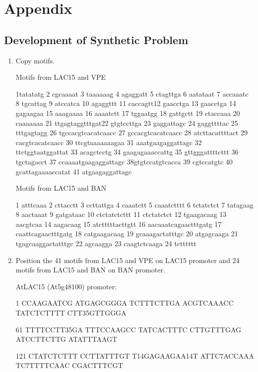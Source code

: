 \chapter{Appendix}\label{chapter:appendix}

\section{Development of Synthetic Problem}

\begin{enumerate}

\item Copy motifs. 
 
Motifs from LAC15 and VPE 

{\tiny
1tatatatg 2 cgcaaaat 3 taaaaaag 4 agaggatt 5 ctagttga 6 aatataat 7 accaaatc 8 tgcattag 9 atccatca 10 agaggttt 11 caccagtt12 gaacctga 13 gaacctga 14 gagaagaa 15 aaagaaaa 16 aaaatctt 17 tggaatgg 18 gattgctt 19 ctaccaaa 20 caaaaaaa 21 ttgagtaggtttgat22 gtgtccttga 23 gaggattagc 24 gaggttttac 25 tttgagtagg 26 tgccacgtcacatcaacc 27 gccacgtcacatcaacc 28 atcttacattttact 29 cacgtcacatcaacc 30 ttcgtaaaaaaagaa 31 aaatgaagaggattagc 32 ttctggtaatggattat 33 acagctcctg 34 gaagagaaaccattg 35 gttgggattttcttt 36 tgctagacct 37 ccaaaatgaagaggattagc 38gtgtccatgtcacca 39 cgtccatgtc 40 gcattagaaaaccatat 41 atgaagaggattagc}

Motifs from LAC15 and BAN


{\tiny
1 atttcaaa 2 cttacctt 3 ccttattga 4 caaatctt 5 caaatctttt 6 tctatctct 7 tatagaag 8 aactaaat 9 gatgataac 10 ctctatctcttt 11 ctctatctct 12 tgaagacaag 13 aacgtcaa 14 aagacaag 15 atctttttacttgtt 16 aacaaatcagaactttgatg 17 caattcagaactttgatg 18 catgaagacaag 19 gcaaagactatttgc 20 atgagcaaga 21 tgagcaaggactatttgc 22 agcaagga 23 caagtctcaaga 24 tctttttt}

\item Position the 41 motifs from LAC15 and VPE on LAC15 promoter and 24 motifs from LAC15 and BAN on BAN promoter.

AtLAC15 (At5g48100) promoter:


{\tiny
1      CCAAGAATCG ATGAGCGGGA TCTTTCTTGA ACGTCAAACC TATCTCTTTT CTT35GTTGGGA

61     TTTTCCTT35GA TTTCCAAGCC TATCACTTTC CTTGTTTGAG ATCCTTCTTG ATATTTAAGT

121    CTATCTCTTT CCTTATTTGT T14GAGAAGAA14T ATTC7ACCAAA TC7TTTTCAAC CGACTTTCGT

}
\end{enumerate}
